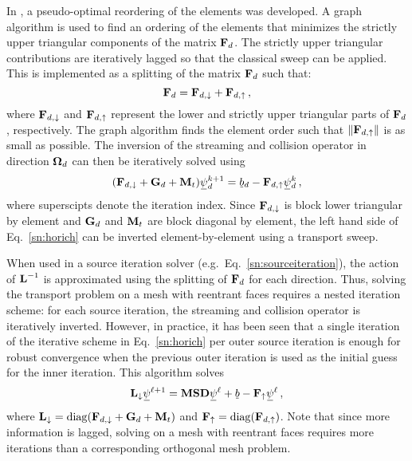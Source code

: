 \documentclass[../doc.tex]{subfiles}
\begin{document}
In \textcite{graph_sweeps}, a pseudo-optimal reordering of the elements was developed. A graph algorithm is used to find an ordering of the elements that minimizes the strictly upper triangular components of the matrix $\boldsymbol{\mathrm{F}}_d$. The strictly upper triangular contributions are iteratively lagged so that the classical sweep can be applied. This is implemented as a splitting of the matrix $\boldsymbol{\mathrm{F}}_d$ such that: 
	\begin{equation}
		\boldsymbol{\mathrm{F}}_d = \boldsymbol{\mathrm{F}}_{d,\downarrow} + \boldsymbol{\mathrm{F}}_{d,\uparrow} \,,
	\end{equation}
where $\boldsymbol{\mathrm{F}}_{d,\downarrow}$ and $\boldsymbol{\mathrm{F}}_{d,\uparrow}$ represent the lower and strictly upper triangular parts of $\boldsymbol{\mathrm{F}}_d$, respectively. The graph algorithm finds the element order such that $\|\boldsymbol{\mathrm{F}}_{d,\uparrow}\|$ is as small as possible. The inversion of the streaming and collision operator in direction $\boldsymbol{\Omega}_d$ can then be iteratively solved using 
	\begin{equation} \label{sn:horich}
		(\mat{F}_{d,\downarrow} + \mat{G}_d + \mat{M}_t)\ubar{\psi}_d^{k+1} = \ubar{b}_d - \mat{F}_{d,\uparrow}\ubar{\psi}_d^{k} \,,
	\end{equation}
where superscipts denote the iteration index. Since $\boldsymbol{\mathrm{F}}_{d,\downarrow}$ is block lower triangular by element and $\boldsymbol{\mathrm{G}}_d$ and $\boldsymbol{\mathrm{M}}_t$ are block diagonal by element, the left hand side of Eq.~\ref{sn:horich} can be inverted element-by-element using a transport sweep. 

When used in a source iteration solver (e.g.~Eq.~\ref{sn:sourceiteration}), the action of $\boldsymbol{\mathrm{L}}^{-1}$ is approximated using the splitting of $\boldsymbol{\mathrm{F}}_d$ for each direction. Thus, solving the transport problem on a mesh with reentrant faces requires a nested iteration scheme: for each source iteration, the streaming and collision operator is iteratively inverted. However, in practice, it has been seen that a single iteration of the iterative scheme in Eq.~\ref{sn:horich} per outer source iteration is enough for robust convergence when the previous outer iteration is used as the initial guess for the inner iteration. This algorithm solves 
	\begin{equation}
		\mat{L}_{\downarrow} \ubar{\psi}^{\ell+1} = \mat{M}\mat{S}\mat{D}\ubar{\psi}^\ell + \ubar{b} - \mat{F}_{\uparrow} \ubar{\psi}^\ell \,, 
	\end{equation}
where $\boldsymbol{\mathrm{L}}_{\downarrow} = \operatorname{diag}(\boldsymbol{\mathrm{F}}_{d,\downarrow} + \boldsymbol{\mathrm{G}}_d + \boldsymbol{\mathrm{M}}_t)$ and $\boldsymbol{\mathrm{F}}_{\uparrow} = \operatorname{diag}(\boldsymbol{\mathrm{F}}_{d,\uparrow})$. 
Note that since more information is lagged, solving on a mesh with reentrant faces requires more iterations than a corresponding orthogonal mesh problem. 
\end{document}
